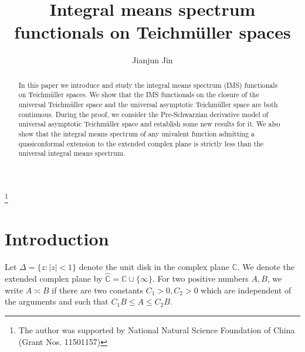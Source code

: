 \documentclass[11pt]{amsart}
\theoremstyle{remark}
\theoremstyle{claim}
\theoremstyle{definition}
\theoremstyle{problem}
\theoremstyle{conjecture}
\theoremstyle{question}
\numberwithin{equation}{section}
\begin{document}
\begin{center}
\title[Integral means spectrum functionals on Teichm\"uller spaces]{Integral means spectrum functionals on Teichm\"uller spaces}
\end{center}

\author{Jianjun Jin}
\address{School of Mathematics, Hefei University of Technology, Xuancheng Campus, Xuancheng 242000, P.R.China}
\thanks{The author was supported by National Natural Science Foundation of China (Grant Nos. 11501157)}




\begin{abstract}
In this paper we introduce and study the integral means spectrum (IMS) functionals on Teichm\"uller spaces. We show that  the IMS functionals on the closure of the universal Teichm\"uller space and the universal asymptotic Teichm\"uller space are both continuous.  During the proof, we consider the Pre-Schwarzian derivative model of universal asymptotic Teichm\"uller space and establish some new results for it. We also show that the integral means spectrum of any univalent function admitting a quasiconformal extension to the extended complex plane is strictly less than the universal integral means spectrum. 
\end{abstract}

\maketitle
\section{{\bf {Introduction}}}
Let $\Delta=\{z:|z|<1\}$ denote the unit disk in the
complex plane $\mathbb{C}$.  We denote the extended complex plane by $\widehat{\mathbb{C}}=\mathbb{C}\cup\{\infty\}$. For two positive numbers $A, B$, we write $A \asymp B$ if there are two constants $C_1>0, C_2>0$ which are independent of the arguments and such that $C_1 B\leq A\leq C_2 B$.
\end{document}
